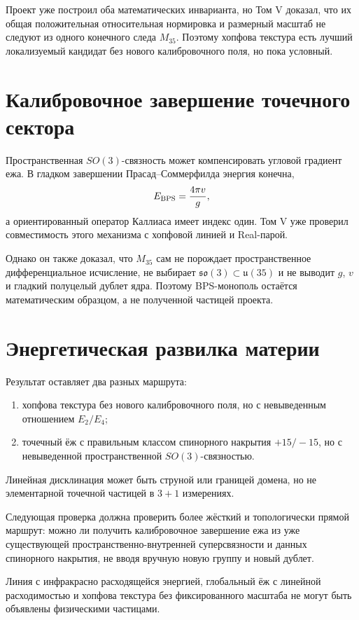 Проект уже построил оба математических инварианта, но Том V доказал, что
их общая положительная относительная нормировка и размерный масштаб не
следуют из одного конечного следа $M_{35}$. Поэтому хопфова текстура есть
лучший локализуемый кандидат без нового калибровочного поля, но пока
условный.

\section{Калибровочное завершение точечного сектора}

Пространственная $SO(3)$-связность может компенсировать угловой градиент
ежа. В гладком завершении Прасад--Соммерфилда энергия конечна,
\begin{equation}
 E_{\rm BPS}=\frac{4\pi v}{g},
\end{equation}
а ориентированный оператор Каллиаса имеет индекс один. Том V уже проверил
совместимость этого механизма с хопфовой линией и Real-парой.

Однако он также доказал, что $M_{35}$ сам не порождает пространственное
дифференциальное исчисление, не выбирает
$\mathfrak{so}(3)\subset\mathfrak u(35)$ и не выводит $g$, $v$ и гладкий
полуцелый дублет ядра. Поэтому BPS-монополь остаётся математическим
образцом, а не полученной частицей проекта.

\section{Энергетическая развилка материи}

Результат оставляет два разных маршрута:
\begin{enumerate}
 \item хопфова текстура без нового калибровочного поля, но с невыведенным
 отношением $E_2/E_4$;
 \item точечный ёж с правильным классом спинорного накрытия $+15/-15$, но с
 невыведенной пространственной $SO(3)$-связностью.
\end{enumerate}
Линейная дисклинация может быть струной или границей домена, но не
элементарной точечной частицей в $3+1$ измерениях.

Следующая проверка должна проверить более жёсткий и топологически прямой
маршрут: можно ли получить калибровочное завершение ежа из уже
существующей пространственно-внутренней суперсвязности и данных спинорного
накрытия, не вводя вручную новую группу и новый дублет.

\begin{nogocriterion}
Линия с инфракрасно расходящейся энергией, глобальный ёж с линейной
расходимостью и хопфова текстура без фиксированного масштаба не могут быть
объявлены физическими частицами.
\end{nogocriterion}


